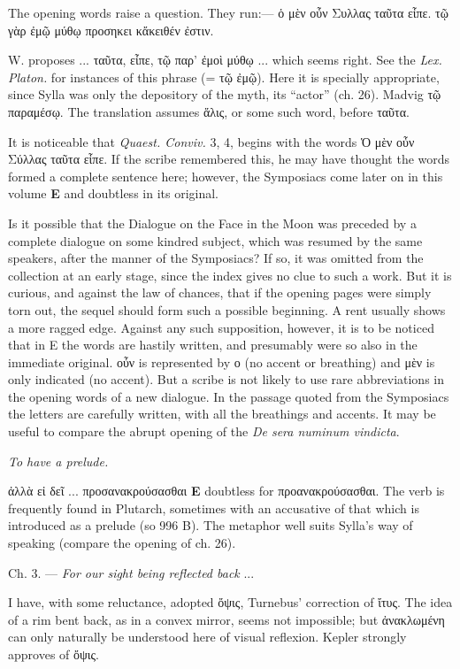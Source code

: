 \documentclass[a4paper, 11pt, oneside, polutonikogreek, english]{article}
\begin{document}
The opening words raise a question. They run:--- ὁ μὲν οὖν Συλλας ταῦτα εἶπε. τῷ γὰρ ἐμῷ μύθῳ προσηκει κἄκειθέν ἐστιν.

W. proposes ... ταῦτα, εἶπε, τῷ παρ' ἐμοὶ μύθῳ ... which seems right. See the \emph{Lex. Platon.} for instances of this phrase (= τῷ ἐμῷ). Here it is specially appropriate, since Sylla was only the depository of the myth, its ``actor'' (ch. 26). Madvig τῷ παραμέσῳ. The translation assumes ἅλις, or some such word, before ταῦτα.

It is noticeable that \emph{Quaest. Conviv.} 3, 4, begins with the words Ὁ μὲν οὖν Σύλλας ταῦτα εἶπε. If the scribe remembered this, he may have thought the words formed a complete sentence here; however, the Symposiacs come later on in this volume \textbf{E} and doubtless in its original.

Is it possible that the Dialogue on the Face in the Moon was preceded by a complete dialogue on some kindred subject, which was resumed by the same speakers, after the manner of the Symposiacs? If so, it was omitted from the collection at an early stage, since the index gives no clue to such a work. But it is curious, and against the law of chances, that if the opening pages were simply torn out, the sequel should form such a possible beginning. A rent usually shows a more ragged edge. Against any such supposition, however, it is to be noticed that in E the words are hastily written, and presumably were so also in the immediate original. οὖν is represented by ο (no accent or breathing) and μὲν is only indicated (no accent). But a scribe is not likely to use rare abbreviations in the opening words of a new dialogue. In the passage quoted from the Symposiacs the letters are carefully written, with all the breathings and accents. It may be useful to compare the abrupt opening of the \emph{De sera numinum vindicta}.

\emph{To have a prelude.}

ἀλλὰ εἰ δεῖ ... προσανακρούσασθαι \textbf{E} doubtless for προανακρούσασθαι. The verb is frequently found in Plutarch, sometimes with an accusative of that which is introduced as a prelude (so 996 B). The metaphor well suits Sylla's way of speaking (compare the opening of ch. 26).

Ch. 3. --- \emph{For our sight being reflected back} ...

I have, with some reluctance, adopted ὄψις, Turnebus' correction of ἴτυς. The idea of a rim bent back, as in a convex mirror, seems not impossible; but ἀνακλωμένη can only naturally be understood here of visual reflexion. Kepler strongly approves of ὄψις. 
\end{document}
